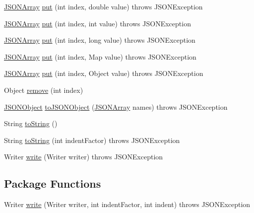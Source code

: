 \begin{DoxyCompactItemize}
\item 
\hyperlink{classorg_1_1json_1_1_j_s_o_n_array}{J\-S\-O\-N\-Array} \hyperlink{classorg_1_1json_1_1_j_s_o_n_array_a44381e6efca784b131ff8d384f41447a}{put} (int index, double value)  throws J\-S\-O\-N\-Exception 
\item 
\hyperlink{classorg_1_1json_1_1_j_s_o_n_array}{J\-S\-O\-N\-Array} \hyperlink{classorg_1_1json_1_1_j_s_o_n_array_a2283abbc9a0e52077d0cce1a3ed8cd39}{put} (int index, int value)  throws J\-S\-O\-N\-Exception 
\item 
\hyperlink{classorg_1_1json_1_1_j_s_o_n_array}{J\-S\-O\-N\-Array} \hyperlink{classorg_1_1json_1_1_j_s_o_n_array_a8e84855241ff2c9af58f47043273956c}{put} (int index, long value)  throws J\-S\-O\-N\-Exception 
\item 
\hyperlink{classorg_1_1json_1_1_j_s_o_n_array}{J\-S\-O\-N\-Array} \hyperlink{classorg_1_1json_1_1_j_s_o_n_array_a95cada0cceecdff12a53c8ee1dd5cd35}{put} (int index, Map value)  throws J\-S\-O\-N\-Exception 
\item 
\hyperlink{classorg_1_1json_1_1_j_s_o_n_array}{J\-S\-O\-N\-Array} \hyperlink{classorg_1_1json_1_1_j_s_o_n_array_a5e2cb4652c3cfec3f955edd32e9aaf87}{put} (int index, Object value)  throws J\-S\-O\-N\-Exception 
\item 
Object \hyperlink{classorg_1_1json_1_1_j_s_o_n_array_ae5a2f41647bb60b10ae23e450a238f86}{remove} (int index)
\item 
\hyperlink{classorg_1_1json_1_1_j_s_o_n_object}{J\-S\-O\-N\-Object} \hyperlink{classorg_1_1json_1_1_j_s_o_n_array_a1b4d06dc69a1289bc2920c5780305962}{to\-J\-S\-O\-N\-Object} (\hyperlink{classorg_1_1json_1_1_j_s_o_n_array}{J\-S\-O\-N\-Array} names)  throws J\-S\-O\-N\-Exception 
\item 
String \hyperlink{classorg_1_1json_1_1_j_s_o_n_array_afc869e72ec78bf906683ab2f77cdba77}{to\-String} ()
\item 
String \hyperlink{classorg_1_1json_1_1_j_s_o_n_array_a4f18bcd5cb7b9f2b7c7918c55e0e9b10}{to\-String} (int indent\-Factor)  throws J\-S\-O\-N\-Exception 
\item 
Writer \hyperlink{classorg_1_1json_1_1_j_s_o_n_array_a28e509c7d8e5606e10a7a321c167aec8}{write} (Writer writer)  throws J\-S\-O\-N\-Exception 
\end{DoxyCompactItemize}
\subsection*{Package Functions}
\begin{DoxyCompactItemize}
\item 
Writer \hyperlink{classorg_1_1json_1_1_j_s_o_n_array_a1014b777a9b43800254b256354f79183}{write} (Writer writer, int indent\-Factor, int indent)  throws J\-S\-O\-N\-Exception 
\end{DoxyCompactItemize}
